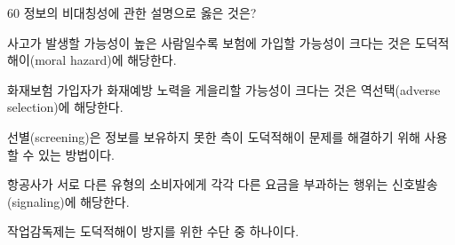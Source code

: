 \begin{question}{60}
정보의 비대칭성에 관한 설명으로 옳은 것은?
\begin{choices}
  \item 사고가 발생할 가능성이 높은 사람일수록 보험에 가입할 가능성이 크다는 것은 도덕적해이(moral hazard)에 해당한다.
  \item 화재보험 가입자가 화재예방 노력을 게을리할 가능성이 크다는 것은 역선택(adverse selection)에 해당한다.
  \item 선별(screening)은 정보를 보유하지 못한 측이 도덕적해이 문제를 해결하기 위해 사용할 수 있는 방법이다.
  \item 항공사가 서로 다른 유형의 소비자에게 각각 다른 요금을 부과하는 행위는 신호발송(signaling)에 해당한다.
  \item 작업감독제는 도덕적해이 방지를 위한 수단 중 하나이다.
\end{choices}
\end{question}
